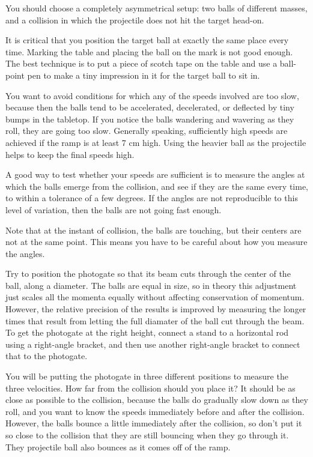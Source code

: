 You should choose a completely asymmetrical setup: two balls
of different masses, and a collision in which the projectile
does not hit the target head-on.

It is critical that you position the target ball at exactly
the same place every time. Marking the table and placing the
ball on the mark is not good enough. The best technique is
to put a piece of scotch tape on the table and use a
ball-point pen to make a tiny impression in it for the
target ball to sit in.


You want to avoid conditions for which any of the speeds
involved are too slow, because then the balls tend to be
accelerated, decelerated, or deflected by tiny bumps in the
tabletop.  If you notice the balls wandering and wavering as
they roll, they are going too slow.  Generally speaking,
sufficiently high speeds are achieved if the ramp is at
least 7 cm high.  Using the heavier ball as the projectile
helps to keep the final speeds high.

A good way to test whether your speeds are sufficient is to
measure the angles at which the balls emerge from the
collision, and see if they are the same every time, to
within a tolerance of a few degrees.  If the angles are not
reproducible to this level of variation, then the balls are
not going fast enough.

Note that at the instant of collision, the balls are
touching, but their centers are not at the same point.  This
means you have to be careful about how you measure the angles.

Try to position the photogate so that its beam cuts through
the center of the ball, along a diameter.
The balls are equal in size, so in theory this adjustment just scales all the momenta equally without affecting conservation of momentum.
However, the relative precision of the results is improved by measuring the longer times
that result from letting the full diamater of the ball cut through the beam.
To get the photogate at the right height, connect a stand to
a horizontal rod using a right-angle bracket, and then use another
right-angle bracket to connect that to the photogate.

You will be putting the photogate in three different
positions to measure the three velocities. How far from the
collision should you place it? It should be as close as
possible to the collision, because the balls do gradually
slow down as they roll, and you want to know the speeds
immediately before and after the collision. However, the
balls bounce a little immediately after the collision, so
don't put it so close to the collision that they are
still bouncing when they go through it. They projectile
ball also bounces as it comes off of the ramp.

